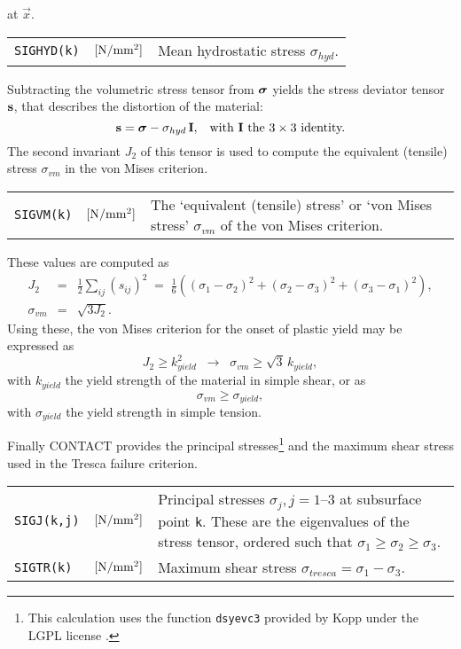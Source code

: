 \documentclass[12pt]{report}
\newenvironment{inputvars}{\vspace{0.4\baselineskip}%

\begin{tabular}{>{\raggedright}p{22mm}p{19mm}p{113mm}}}{
\end{tabular}

}
\newcommand{\inpvar}[3]{{\small\tt #1} & $#2$ & #3 \\[1ex]}
\newcommand{\inpvarw}[3]{\mbox{{\small\tt #1}\hspace{-5mm}} & $#2$ & #3 \\[1ex]}
\begin{document}
at $\vec{x}$.
\begin{inputvars}
\inpvar{\tt SIGHYD(k)}{\bunit{N/mm^2}}{Mean hydrostatic stress $\sigma_{hyd}$.}
\end{inputvars}
Subtracting the volumetric stress tensor from $\boldsymbol{\sigma}$ yields the stress
deviator tensor $\mathbf{s}$, that describes the distortion of the material:
\begin{equation}
        \mathbf{s} = \boldsymbol{\sigma} - \sigma_{hyd}\,\mathbf{I}, \;\;\;
        \mbox{with $\mathbf{I}$ the $3\times 3$ identity.}
\end{equation}
The second invariant $J_2$ of this tensor is used to compute the equivalent
(tensile) stress $\sigma_{vm}$ in the von Mises criterion.
\begin{inputvars}
\inpvar{\tt SIGVM(k)}{\bunit{N/mm^2}}{The `equivalent (tensile) stress' or 
        `von Mises stress' $\sigma_{vm}$ of the von Mises criterion.}
\end{inputvars}
These values are computed as
\begin{eqnarray}
    J_2 &=& \frac{1}{2} \sum_{ij} (s_{ij})^2 
        \;=\; \frac{1}{6} \left( (\sigma_1 - \sigma_2)^2 + 
        (\sigma_2 - \sigma_3)^2 + (\sigma_3 - \sigma_1)^2 \right)
        , \label{eq:j2_stress} \\
   \sigma_{vm} &=& \sqrt{3 J_2} \label{eq:sigvm}.
\end{eqnarray}
Using these, the von Mises criterion for the onset of plastic yield may be
expressed as 
\begin{equation}
        J_2\ge k_{yield}^2 
    \;\;\rightarrow\;\; \sigma_{vm} \ge \sqrt{3}\, k_{yield},
\end{equation}
with $k_{yield}$ the yield strength of the material in simple shear, or as
\begin{equation}
        \sigma_{vm}\ge\sigma_{yield},
\end{equation}
with $\sigma_{yield}$ the yield strength in simple tension.

Finally CONTACT provides the principal stresses\footnote{This calculation
uses the function {\tt dsyevc3} provided by Kopp under the LGPL license
\cite{Kopp2008}.} and the maximum shear
stress used in the Tresca failure criterion.
\begin{inputvars}
\inpvarw{\tt SIGJ(k,j)}{\bunit{N/mm^2}}{Principal stresses $\sigma_j,
        j=1\text{--}3$ at subsurface point {\tt k}. These are the
        eigenvalues of the stress tensor, ordered such that $\sigma_1
        \ge \sigma_2 \ge \sigma_3$.\label{page:sigmaj}}
\inpvar{\tt SIGTR(k)}{\bunit{N/mm^2}}{Maximum shear stress
        $\sigma_{tresca}=\sigma_1 - \sigma_3$.}
\end{inputvars}
\end{document}
